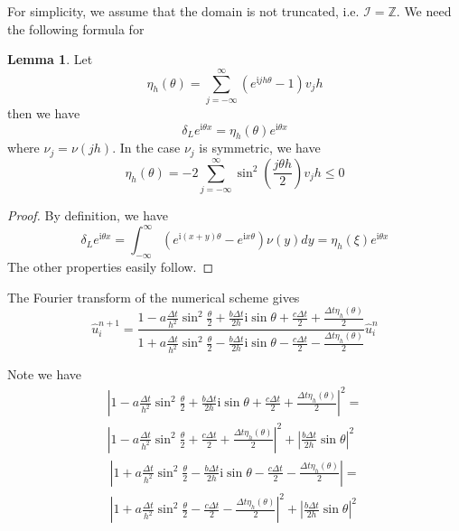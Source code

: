 \documentclass[10pt,a4paper]{article}
\newcommand{\ii}[0]{\mathrm{i}}
\theoremstyle{definition}
\newtheorem{lemma}{Lemma}
\begin{document}
For simplicity, we assume that the domain is not truncated, i.e. $\mathcal{I}=\mathbb{Z}$. We need the following formula for 
\begin{lemma}
	Let 
	\begin{equation}
		\eta_h(\theta) = \sum_{j=-\infty}^\infty (e^{\ii jh\theta}-1)v_jh
	\end{equation}
	then we have
	\begin{equation}
		\delta_L e^{\ii \theta x} = \eta_h(\theta) e^{\ii \theta x}
	\end{equation}
	where $\nu_j = \nu(jh)$. In the case $\nu_j$ is symmetric, we have
	\begin{equation}
		\eta_h(\theta) = -2\sum_{j=-\infty}^\infty \sin^2\left(\frac{j\theta h}{2} \right) v_jh\leq 0
	\end{equation}
\end{lemma}
\begin{proof}
	By definition, we have
	\[{\delta _L}{e^{\ii\theta x}} = \int_{ - \infty }^\infty  {\left( {{e^{\ii(x + y)\theta }} - {e^{\ii x\theta }}} \right)\nu (y)dy = {\eta _h}(\xi )} {e^{\ii\theta x}}\]
	The other properties easily follow. 
\end{proof}

The Fourier transform of the numerical scheme gives
\begin{equation}\label{equ:von}
	\hat u_i^{n+1} = \frac{{1 - a\frac{{\Delta t}}{{{h^2}}}{{\sin }^2}\frac{\theta }{2} + \frac{{b\Delta t}}{{2h}}\ii\sin \theta  + \frac{{c\Delta t}}{2}+ \frac{{\Delta t\eta_h (\theta )}}{2}}}{{1 + a\frac{{\Delta t}}{{{h^2}}}{{\sin }^2}\frac{\theta }{2} - \frac{{b\Delta t}}{{2h}}\ii\sin \theta  - \frac{{c\Delta t}}{2} - \frac{{\Delta t\eta_h (\theta )}}{2}}} \hat u_i^n
\end{equation}

Note we have
\begin{multline}
{\left| {1 - a\frac{{\Delta t}}{{{h^2}}}{{\sin }^2}\frac{\theta }{2} + \frac{{b\Delta t}}{{2h}}\ii\sin \theta  + \frac{{c\Delta t}}{2} + \frac{{\Delta t\eta_h (\theta )}}{2}} \right|^2} = \\
{\left| {1 - a\frac{{\Delta t}}{{{h^2}}}{{\sin }^2}\frac{\theta }{2} + \frac{{c\Delta t}}{2} + \frac{{\Delta t\eta_h (\theta )}}{2}} \right|^2} + {\left| {\frac{{b\Delta t}}{{2h}}\sin \theta } \right|^2}
\end{multline}
\begin{multline}
\left| {1 + a\frac{{\Delta t}}{{{h^2}}}{{\sin }^2}\frac{\theta }{2} - \frac{{b\Delta t}}{{2h}}\ii\sin \theta  - \frac{{c\Delta t}}{2} - \frac{{\Delta t\eta_h (\theta )}}{2}} \right| = \\
{\left| {1 + a\frac{{\Delta t}}{{{h^2}}}{{\sin }^2}\frac{\theta }{2} - \frac{{c\Delta t}}{2} - \frac{{\Delta t\eta_h (\theta )}}{2}} \right|^2} + {\left| {\frac{{b\Delta t}}{{2h}}\sin \theta } \right|^2}
\end{multline}
\end{document}
